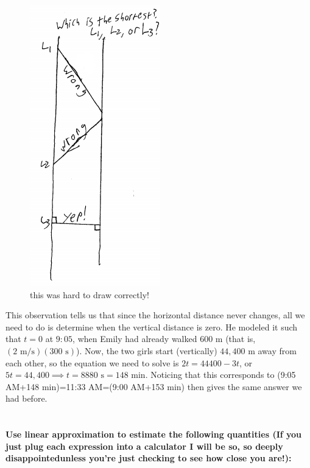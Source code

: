 \documentclass[english]{article}
\newcommand{\ms}{\text{ m/s}}
\newcommand{\ml}{\text{ m}}
\newcommand{\st}{\text{ s}}
\newcommand{\prob}[1]{\setcounter{section}{#1-1}\section{}}
\theoremstyle{remark}
\theoremstyle{definition}
\begin{document}
\begin{figure}[h!]\begin{centering}
	\includegraphics[scale=.6]{fig4}\caption{this was hard to draw correctly!}\label{par}
\end{centering}\end{figure}

 This observation tells us that since the horizontal distance never changes, all we need to do is determine when the vertical distance is zero. He modeled it such that $t=0$ at $9:05$, when Emily had already walked 600$\ml$ (that is, $(2\ms)(300\st)$). Now, the two girls start (vertically) $44,400\ml$ away from each other, so the equation we need to solve is $2t=44400-3t$, or $5t=44,400\implies t=8880\st=148$ min. Noticing that this corresponds to (9:05 AM+148 min)=11:33 AM=(9:00 AM+153 min) then gives the same answer we had before. 
\prob{3}
\textbf{Use linear approximation to estimate the following quantities (If you just plug each expression into a calculator I will be so, so deeply disappointed\textemdash unless you're just checking to see how close you are!):}
\end{document}
